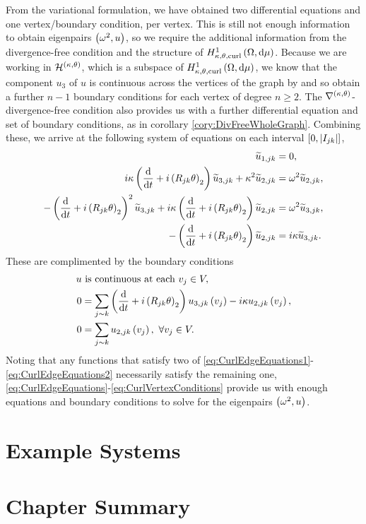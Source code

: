 From the variational formulation, we have obtained two differential equations and one vertex/boundary condition, per vertex.
This is still not enough information to obtain eigenpairs $\left( \omega^2, u \right)$, so we require the additional information from the divergence-free condition and the structure of $H^1_{\kappa,\theta,\mathrm{curl}}\left( \Omega, \mathrm{d}\mu \right)$.
Because we are working in $\mathcal{H}^{\left( \kappa, \theta \right)}$, which is a subspace of $H^1_{\kappa,\theta,\mathrm{curl}}\left( \Omega, \mathrm{d}\mu \right)$, we know that the component $u_3$ of $u$ is continuous across the vertices of the graph by  and so obtain a further $n-1$ boundary conditions for each vertex of degree $n\geq2$.
The $\nabla^{\left( \kappa, \theta \right)}$-divergence-free condition also provides us with a further differential equation and set of boundary conditions, as in corollary \ref{cory:DivFreeWholeGraph}.
Combining these, we arrive at the following system of equations on each interval $\left[ 0,\left\lvert I_{jk} \right\rvert \right]$,
\begin{subequations} \label{eq:CurlEdgeEquations}
	\begin{align}
		\widetilde{u}_{1,jk} &= 0, \\
		i\kappa\left( \dfrac{\mathrm{d}}{\mathrm{d}t} + i\left( R_{jk}\theta \right)_2 \right)\widetilde{u}_{3,jk} + \kappa^2\widetilde{u}_{2,jk} &= \omega^2 \widetilde{u}_{2,jk}, \label{eq:CurlEdgeEquations1} \\
		-\left( \dfrac{\mathrm{d}}{\mathrm{d}t} + i\left( R_{jk}\theta \right)_2 \right)^2\widetilde{u}_{3,jk} + i\kappa\left( \dfrac{\mathrm{d}}{\mathrm{d}t} + i\left( R_{jk}\theta \right)_2 \right)\widetilde{u}_{2,jk} &= \omega^2\widetilde{u}_{3,jk}, \label{eq:CurlEdgeEquations2} \\
		-\left( \dfrac{\mathrm{d}}{\mathrm{d}t} + i\left( R_{jk}\theta \right)_2 \right)\widetilde{u}_{2,jk} &= i\kappa\widetilde{u}_{3,jk}. \label{eq:CurlEdgeEquations3}
	\end{align}
\end{subequations}
These are complimented by the boundary conditions
\begin{subequations} \label{eq:CurlVertexConditions}
	\begin{align}
		u &\text{ is continuous at each } v_j\in V, \\
		0 &= \sum_{j\sim k} \left( \dfrac{\mathrm{d}}{\mathrm{d}t} + i\left( R_{jk}\theta \right)_2 \right)u_{3,jk}\left( v_j \right) - i\kappa u_{2,jk}\left( v_j \right), \\
		0 &= \sum_{j\sim k}u_{2,jk}\left( v_j \right), \ \forall v_j\in V.
	\end{align}
\end{subequations}
Noting that any functions that satisfy two of \eqref{eq:CurlEdgeEquations1}-\eqref{eq:CurlEdgeEquations2} necessarily satisfy the remaining one, \eqref{eq:CurlEdgeEquations}-\eqref{eq:CurlVertexConditions} provide us with enough equations and boundary conditions to solve for the eigenpairs $\left( \omega^2, u \right)$.

\section{Example Systems} \label{sec:CurlEqnExamples}

\section{Chapter Summary} \label{sec:CurlSummary}
